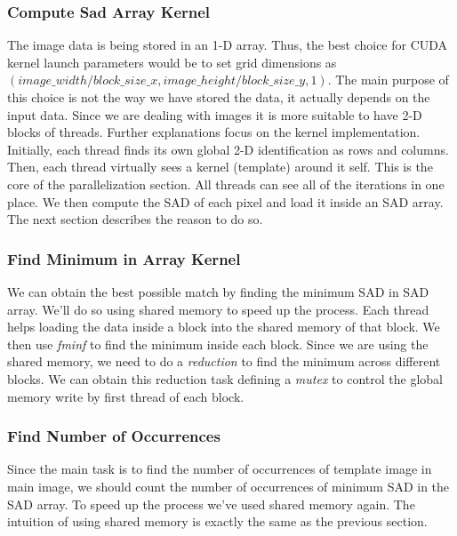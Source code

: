 \subsubsection{Compute Sad Array Kernel}
The image data is being stored in an 1-D array. Thus, the best choice for CUDA kernel launch parameters would be to set grid dimensions as $(image\_width/block\_size\_x, image\_height/block\_size\_y, 1)$. The main purpose of this choice is not the way we have stored the data, it actually depends on the input data. Since we are dealing with images it is more suitable to have 2-D blocks of threads. Further explanations focus on the kernel implementation. Initially, each thread finds its own global 2-D identification as rows and columns. Then, each thread virtually sees a kernel (template) around it self. This is the core of the parallelization section. All threads can see all of the iterations in one place. We then compute the SAD of each pixel and load it inside an SAD array. The next section describes the reason to do so.

\subsubsection{Find Minimum in Array Kernel}
We can obtain the best possible match by finding the minimum SAD in SAD array. We'll do so using shared memory to speed up the process. Each thread helps loading the data inside a block into the shared memory of that block. We then use \textit{fminf} to find the minimum inside each block. Since we are using the shared memory, we need to do a \textit{reduction} to find the minimum across different blocks. We can obtain this reduction task defining a \textit{mutex} to control the global memory write by first thread of each block.

\subsubsection{Find Number of Occurrences}
Since the main task is to find the number of occurrences of template image in main image, we should count the number of occurrences of minimum SAD in the SAD array. To speed up the process we've used shared memory again. The intuition of using shared memory is exactly the same as the previous section.